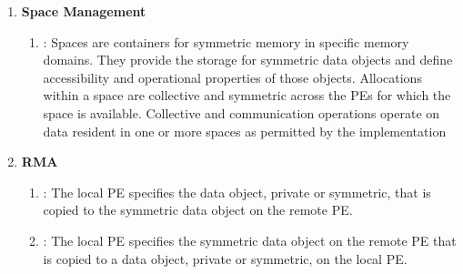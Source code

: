 \begin{enumerate}
\item \textbf{Space Management}
\begin{enumerate}
    \item {}: Spaces are containers for symmetric memory in specific memory
    domains. They provide the storage for \openshmem symmetric data objects and
    define accessibility and operational properties of those objects. Allocations
    within a space are collective and symmetric across the \acp{PE} for which the
    space is available. Collective and communication operations operate on data
    resident in one or more spaces as permitted by the implementation
\end{enumerate}

\item \textbf{\acf{RMA}}
\begin{enumerate}
    \item \PUT: The local \ac{PE} specifies the \source{} data object, private
        or symmetric, that is copied to the symmetric data object on the remote
        \ac{PE}.
  \item \GET: The local \ac{PE} specifies the symmetric data object on the remote
      \ac{PE} that is copied to a data object, private or symmetric, on the local
      \ac{PE}.
\end{enumerate}


\end{enumerate}
